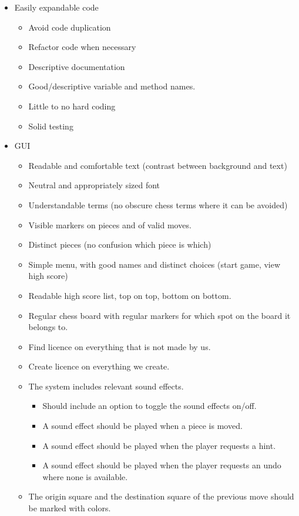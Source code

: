 \documentclass{article}
\begin{document}
\begin{itemize}
	\item Easily expandable code
	\begin{itemize}
		\item Avoid code duplication
		\item Refactor code when necessary 
		\item Descriptive documentation
		\item Good/descriptive variable and method names.
		\item Little to no hard coding
		\item Solid testing
	\end{itemize}
	\item GUI
	\begin{itemize}
		\item Readable and comfortable text (contrast between background and text)
		\item Neutral and appropriately sized font
		\item Understandable terms (no obscure chess terms where it can be avoided)
		\item Visible markers on pieces and of valid moves.
		\item Distinct pieces (no confusion which piece is which)
		\item Simple menu, with good names and distinct choices (start game, view high score)
		\item Readable high score list, top on top, bottom on bottom.
		\item Regular chess board with regular markers for which spot on the board it belongs to.
		\item Find licence on everything that is not made by us.
		\item Create licence on everything we create.
		\item The system includes relevant sound effects.
		\begin{itemize}
			\item Should include an option to toggle the sound effects on/off.
			\item  A sound effect should be played when a piece is moved. 
			\item A sound effect should be played when the player requests a hint.
			\item A sound effect should be played when the player requests an undo where none is available.
		\end{itemize}
		\item The origin square and the destination square of the previous move should be marked with colors.

\end{itemize}
\end{itemize}
\end{document}
